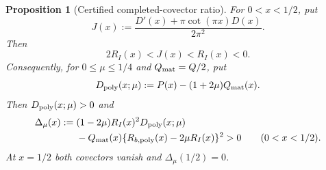 \documentclass[11pt]{amsart}
\numberwithin{equation}{section}
\newtheorem{proposition}[theorem]{Proposition}
\theoremstyle{definition}
\theoremstyle{remark}
\begin{document}
\begin{proposition}[Certified completed-covector ratio]
\label{JC:prop:regular-completed-covector-ratio}
For $0<x<1/2$, put
\[
 J(x):=\frac{D'(x)+\pi\cot(\pi x)D(x)}{2\pi^2}.
\]
Then
\begin{equation}\label{JC:eq:regular-completed-covector-ratio}
 \boxed{2R_I(x)<J(x)<R_I(x)<0.}
\end{equation}
Consequently, for $0\le\mu\le1/4$ and
$Q_{\rm mat}=Q/2$,
put
\[
 D_{\rm poly}(x;\mu)
 :=P(x)-(1+2\mu)Q_{\rm mat}(x).
\]
Then $D_{\rm poly}(x;\mu)>0$ and
\begin{equation}\label{JC:eq:regular-completed-covector-determinant}
 \begin{aligned}
 \Delta_\mu(x):={}&(1-2\mu)R_I(x)^2
 D_{\rm poly}(x;\mu)\\
 &-Q_{\rm mat}(x)
 \{R_{b,{\rm poly}}(x)-2\mu R_I(x)\}^2>0
 \qquad(0<x<1/2).
 \end{aligned}
\end{equation}
At $x=1/2$ both covectors vanish and $\Delta_\mu(1/2)=0$.
\end{proposition}
\end{document}
